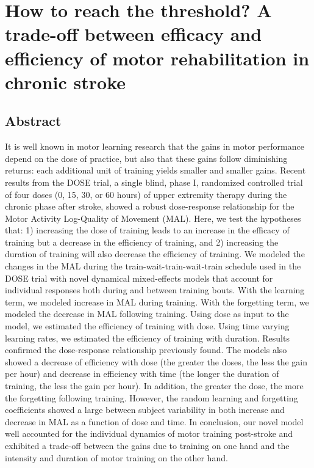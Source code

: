 \chapter{How to reach the threshold? A trade-off between efficacy and efficiency of motor rehabilitation in chronic stroke}
\label{cha:dose}

\section{Abstract}
It is well known in motor learning research that the gains in motor performance depend on the dose of practice, but also that these gains follow diminishing returns: each additional unit of training yields smaller and smaller gains. 
Recent results from the DOSE trial, a single blind, phase I, randomized controlled trial of four doses (0, 15, 30, or 60 hours) of upper extremity therapy during the chronic phase after stroke, showed a robust dose-response relationship for the Motor Activity Log-Quality of Movement (MAL).  
Here, we test the hypotheses that: 1) increasing the dose of training leads to an increase in the efficacy of training but a decrease in the efficiency of training, and 2) increasing the duration of training will also decrease the efficiency of training. 
We modeled the changes in the MAL during the train-wait-train-wait-train schedule used in the DOSE trial with novel dynamical mixed-effects models that account for individual responses both during and between training bouts. 
With the learning term, we modeled increase in MAL during training.  
With the forgetting term, we modeled the decrease in MAL following training. 
Using dose as input to the model, we estimated the efficiency of training with dose. 
Using time varying learning rates, we estimated the efficiency of training with duration. 
Results confirmed the dose-response relationship previously found. 
The models also showed a decrease of efficiency with dose (the greater the doses, the less the gain per hour) and decrease in efficiency with time (the longer the duration of training, the less the gain per hour). 
In addition, the greater the dose, the more the forgetting following training. 
However, the random learning and forgetting coefficients showed a large between subject variability in both increase and decrease in MAL as a function of dose and time. 
In conclusion, our novel model well accounted for the individual dynamics of motor training post-stroke and exhibited a trade-off between the gains due to training on one hand and the intensity and duration of motor training on the other hand. 


